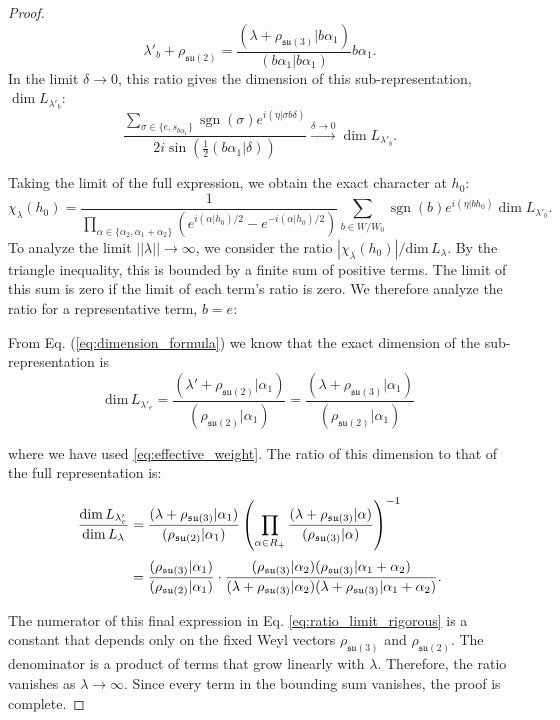\documentclass[11pt, a4paper]{article}
\DeclareMathOperator{\sgn}{sgn}
\newcommand{\dimL}{\mathrm{dim}\,L_\lambda}
\newcommand{\su}{\mathfrak{su}}
\theoremstyle{definition}
\theoremstyle{remark}
\begin{document}
\begin{proof}
\begin{equation}
    \label{eq:effective_weight}
    \lambda'_{b} + \rho_{\su(2)} = \frac{(\lambda + \rho_{\su(3)}|b\alpha_1)}{(b\alpha_1|b\alpha_1)} b\alpha_1.
\end{equation}
 In the limit $\delta \to 0$, this ratio gives the dimension of this sub-representation, $\dim L_{\lambda'_{b}}$:
\begin{equation}
    \frac{\sum_{\sigma \in \{e, s_{b\alpha_1}\}} \sgn(\sigma) e^{i(\eta|\sigma b\delta)}}{2i\sin\left(\frac{1}{2}(b\alpha_1|\delta)\right)} \xrightarrow{\delta \to 0} \dim L_{\lambda'_{b}}.
\end{equation}

Taking the limit of the full expression, we obtain the exact character at $h_0$:
\begin{equation}
    \chi_\lambda(h_0) = \frac{1}{\prod_{\alpha \in \{\alpha_2, \alpha_1+\alpha_2\}} \left(e^{i(\alpha|h_0)/2} - e^{-i(\alpha|h_0)/2}\right)} \sum_{b \in W/W_0} \sgn(b) e^{i(\eta|b h_0)} \dim L_{\lambda'_{b}}.
\end{equation}
To analyze the limit $||\lambda|| \to \infty$, we consider the ratio $|\chi_\lambda(h_0)|/\dimL$. By the triangle inequality, this is bounded by a finite sum of positive terms. The limit of this sum is zero if the limit of each term's ratio is zero. We therefore analyze the ratio for a representative term, $b=e$:

From Eq. (\ref{eq:dimension_formula}) we know that the exact dimension of the sub-representation is 
\begin{equation}
    \mathrm{dim}\,L_{\lambda'_{e}} = \frac{(\lambda' + \rho_{\su(2)}|\alpha_1)}{(\rho_{\su(2)}|\alpha_1)}= \frac{(\lambda + \rho_{\su(3)}|\alpha_1)}{(\rho_{\su(2)}|\alpha_1)}
\end{equation}

where we have used \ref{eq:effective_weight}. The ratio of this dimension to that of the full representation is:

\begin{align}
    \frac{\mathrm{dim}\,L_{\lambda'_{e}}}{\mathrm{dim}\,L_\lambda} 
    &= \frac{(\lambda + \rho_{\su(3)}|\alpha_1)}{(\rho_{\su(2)}|\alpha_1)} \left( \prod_{\alpha \in R_+} \frac{(\lambda+\rho_{\su(3)}|\alpha)}{(\rho_{\su(3)}|\alpha)} \right)^{-1} \nonumber \\[\jot]
    &= \frac{(\rho_{\su(3)}|\alpha_1)}{(\rho_{\su(2)}|\alpha_1)} \cdot \frac{(\rho_{\su(3)}|\alpha_2)(\rho_{\su(3)}|\alpha_1+\alpha_2)}{(\lambda+\rho_{\su(3)}|\alpha_2)(\lambda+\rho_{\su(3)}|\alpha_1+\alpha_2)}. \label{eq:ratio_limit_rigorous}
\end{align}

The numerator of this final expression in Eq. \eqref{eq:ratio_limit_rigorous} is a constant that depends only on the fixed Weyl 
vectors $\rho_{\su(3)}$ and $\rho_{\su(2)}$. The denominator is a product of terms that grow linearly with $\lambda$. 
Therefore, the ratio vanishes as $\lambda \to \infty$. Since every term in the bounding sum 
vanishes, the proof is complete.

\end{proof}
\end{document}
